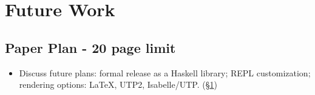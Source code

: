 \section{Future Work}\label{sec:Future}

\subsection*{Paper Plan - 20 page limit}

\begin{itemize}
  \item
    Discuss future plans: formal release as a Haskell library;
    REPL customization; rendering options: \LaTeX, UTP2, Isabelle/UTP\cite{DBLP:conf/utp/FosterZW14}.
    (\S\ref{sec:Future})
\end{itemize}
